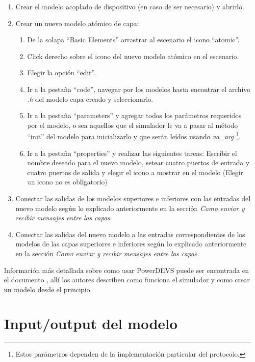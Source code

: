 \documentclass[10pt,a4paper]{article}
\begin{document}
\begin{enumerate}
\item Crear el modelo acoplado de dispositivo (en caso de ser necesario) y abrirlo.
\item Crear un nuevo modelo atómico de capa:
\begin{enumerate}
\item De la solapa ``Basic Elements'' arrastrar al escenario el icono ``atomic''.
\item Click derecho sobre el icono del nuevo modelo atómico en el escenario.
\item Elegir la opción  ``edit''.
\item Ir a la pestaña ``code'', navegar por los modelos hasta encontrar el archivo \textit{.h} del modelo capa creado y seleccionarlo.
\item Ir a la pestaña ``parameters'' y agregar todos los parámetros requeridos por el modelo, o sea aquellos que el simulador le va a pasar al método ``init'' del modelo para inicializarlo y que serán leídos usando \textit{va\_arg} \footnote{Estos parámetros dependen de la implementación particular del protocolo.}.
\item Ir a la pestaña ``properties'' y realizar las siguientes tareas: Escribir el nombre deseado para el nuevo modelo, setear cuatro puertos de entrada y cuatro puertos de salida y elegir el icono a mostrar en el modelo (Elegir un icono no es obligatorio)
\end{enumerate}
\item Conectar las salidas de los modelos superiores e inferiores con las entradas del nuevo modelo según lo explicado anteriormente en la sección \textit{Como enviar y recibir mensajes entre las capas}.
\item Conectar las salidas del nuevo modelo a las entradas correspondientes de los modelos de las capas superiores e inferiores según lo explicado anteriormente en la sección \textit{Como enviar y recibir mensajes entre las capas}.
\end{enumerate}

Información más detallada sobre como usar PowerDEVS puede ser encontrada en el documento \cite{bergero2011powerdevs}, allí los autores describen como funciona el simulador y como crear un modelo desde el principio. \\

\section{Input/output del modelo}
\end{document}
